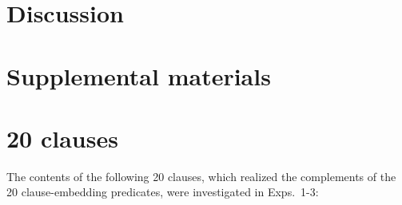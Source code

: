 \documentclass[11pt,fleqn]{article}
\newcommand{\6}{\mbox{$[\hspace*{-.6mm}[$}}
\newcommand{\9}{\mbox{$]\hspace*{-.6mm}]$}}
\begin{document}
\section{Discussion}\label{s4}




\newpage

\section*{Supplemental materials}

\appendix

\setcounter{page}{1}

\setcounter{table}{0}
\renewcommand{\thetable}{A\arabic{table}}

\setcounter{figure}{0}
\renewcommand{\thefigure}{A\arabic{figure}}

\section{20 clauses}\label{a-clauses}

The contents of the following 20 clauses, which realized the complements of the 20 clause-embedding predicates, were investigated in Exps.~1-3:
\end{document}
